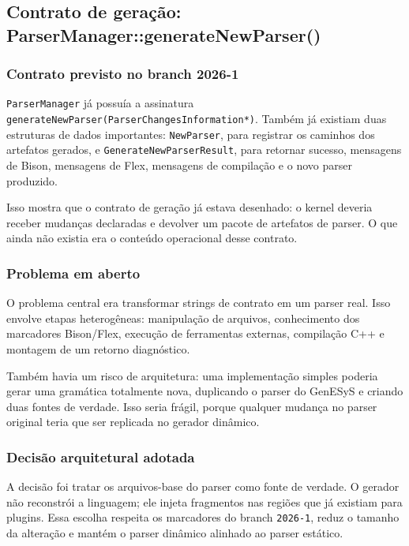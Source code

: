 \documentclass[12pt,a4paper]{article}
\begin{document}
\subsection{Contrato de gera\c{c}\~ao: ParserManager::generateNewParser()}

\subsubsection{Contrato previsto no branch 2026-1}

\texttt{ParserManager} j\'a possu\'ia a assinatura \texttt{generateNewParser(ParserChangesInformation*)}. Tamb\'em j\'a existiam duas estruturas de dados importantes: \texttt{NewParser}, para registrar os caminhos dos artefatos gerados, e \texttt{GenerateNewParserResult}, para retornar sucesso, mensagens de Bison, mensagens de Flex, mensagens de compila\c{c}\~ao e o novo parser produzido.

Isso mostra que o contrato de gera\c{c}\~ao j\'a estava desenhado: o kernel deveria receber mudan\c{c}as declaradas e devolver um pacote de artefatos de parser. O que ainda n\~ao existia era o conte\'udo operacional desse contrato.

\subsubsection{Problema em aberto}

O problema central era transformar strings de contrato em um parser real. Isso envolve etapas heterog\^eneas: manipula\c{c}\~ao de arquivos, conhecimento dos marcadores Bison/Flex, execu\c{c}\~ao de ferramentas externas, compila\c{c}\~ao C++ e montagem de um retorno diagn\'ostico.

Tamb\'em havia um risco de arquitetura: uma implementa\c{c}\~ao simples poderia gerar uma gram\'atica totalmente nova, duplicando o parser do GenESyS e criando duas fontes de verdade. Isso seria fr\'agil, porque qualquer mudan\c{c}a no parser original teria que ser replicada no gerador din\^amico.

\subsubsection{Decis\~ao arquitetural adotada}

A decis\~ao foi tratar os arquivos-base do parser como fonte de verdade. O gerador n\~ao reconstr\'oi a linguagem; ele injeta fragmentos nas regi\~oes que j\'a existiam para plugins. Essa escolha respeita os marcadores do branch \texttt{2026-1}, reduz o tamanho da altera\c{c}\~ao e mant\'em o parser din\^amico alinhado ao parser est\'atico.
\end{document}
